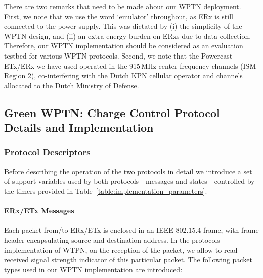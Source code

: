 \documentclass[11pt,draftclsnofoot,journal,onecolumn]{IEEEtran}
\begin{document}
There are two remarks that need to be made about our WPTN deployment. First, we note that we use the word `emulator' throughout, as ERx is still connected to the power supply. This was dictated by (i) the simplicity of the WPTN design, and (ii) an extra energy burden on ERxs due to data collection. Therefore, our WPTN implementation should be considered as an evaluation testbed for various WPTN protocols. Second, we note that the Powercast ETx/ERx we have used operated in the 915\,MHz center frequency channels (ISM Region 2), co-interfering with the Dutch KPN cellular operator and channels allocated to the Dutch Ministry of Defense.

\subsection{Green WPTN: Charge Control Protocol Details and Implementation}
\label{sec:wptn_network_protocol_implementation_experiment}

\subsubsection{Protocol Descriptors}

Before describing the operation of the two protocols in detail we introduce a set of support variables used by both protocols---messages and states---controlled by the timers provided in Table~\ref{table:implementation_parameters}.

\paragraph{ERx/ETx Messages}
\label{sec:p1_msgs}

Each packet from/to ERx/ETx is enclosed in an IEEE 802.15.4 frame, with frame header encapsulating source and destination address. In the protocols implementation of WTPN, on the reception of the packet, we allow to read received signal strength indicator of this particular packet. The following packet types used in our WPTN implementation are introduced:
\end{document}
